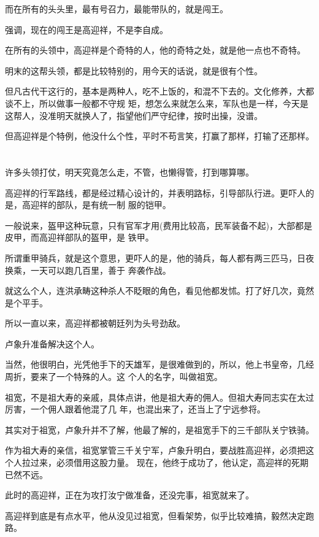 \documentclass[11pt,a4paper,onecolumn]{article}
\begin{document}
而在所有的头头里，最有号召力，最能带队的，就是闯王。

强调，现在的闯王是高迎祥，不是李自成。

在所有的头领中，高迎祥是个奇特的人，他的奇特之处，就是他一点也不奇特。

明末的这帮头领，都是比较特别的，用今天的话说，就是很有个性。

但凡古代干这行的，基本是两种人，吃不上饭的，和混不下去的。文化修养，大都谈不上，所以做事一般都不守规
矩，想怎么来就怎么来，军队也是一样，今天是这帮人，没准明天就换人了，指望他们严守纪律，按时出操，没谱。

但高迎祥是个特例，他没什么个性，平时不苟言笑，打赢了那样，打输了还那样。

\section[\thesection]{}

许多头领打仗，明天究竟怎么走，不管，也懒得管，打到哪算哪。

高迎祥的行军路线，都是经过精心设计的，并表明路标，引导部队行进。更吓人的是，高迎祥的部队，是有统一制
服的\myrule 铠甲。

一般说来，盔甲这种玩意，只有官军才用(费用比较高，民军装备不起)，大部都是皮甲，而高迎祥部队的盔甲，是
铁甲。

所谓重甲骑兵，就是这个意思，更吓人的是，他的骑兵，每人都有两三匹马，日夜换乘，一天可以跑几百里，善于
奔袭作战。

就这么个人，连洪承畴这种杀人不眨眼的角色，看见他都发怵。打了好几次，竟然是个平手。

所以一直以来，高迎祥都被朝廷列为头号劲敌。

卢象升准备解决这个人。

当然，他很明白，光凭他手下的天雄军，是很难做到的，所以，他上书皇帝，几经周折，要来了一个特殊的人。这
个人的名字，叫做祖宽。

祖宽，不是祖大寿的亲戚，具体点讲，他是祖大寿的佣人。但祖大寿同志实在太过厉害，一个佣人跟着他混了几
年，也混出来了，还当上了宁远参将。

其实对于祖宽，卢象升并不了解，他最了解的，是祖宽手下的三千部队\myrule 关宁铁骑。

作为祖大寿的亲信，祖宽掌管三千关宁军，卢象升明白，要战胜高迎祥，必须把这个人拉过来，必须借用这股力量。
现在，他终于成功了，他认定，高迎祥的死期已然不远。

此时的高迎祥，正在为攻打汝宁做准备，还没完事，祖宽就来了。

高迎祥到底是有点水平，他从没见过祖宽，但看架势，似乎比较难搞，毅然决定跑路。
\end{document}
